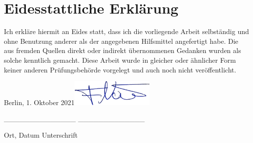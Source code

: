 \thispagestyle{empty}
\section*{Eidesstattliche Erklärung}

Ich erkläre hiermit an Eides statt, dass ich die vorliegende Arbeit selbständig und ohne Benutzung anderer als der angegebenen Hilfsmittel angefertigt habe. Die aus fremden Quellen direkt oder indirekt übernommenen Gedanken wurden als solche kenntlich gemacht. Diese Arbeit wurde in gleicher oder ähnlicher Form keiner anderen Prüfungsbehörde vorgelegt und auch noch nicht veröffentlicht.


\vspace{3cm}

\hspace{0.45cm} Berlin, 1. Oktober 2021\hfill\includegraphics[width=115pt]{../images/signature/signature.png} \hspace{1.6cm}
\vspace{-0,6cm}

\hspace{0,4cm} \_\_\_\_\_\_\_\_\_\_\_\_\_\_ \hfill \_\_\_\_\_\_\_\_\_\_\_\_\_ \hspace{1.5cm}
\vspace{-0,1cm}

\hspace{1.5cm} Ort, Datum \hfill Unterschrift \hspace{2.35cm}
